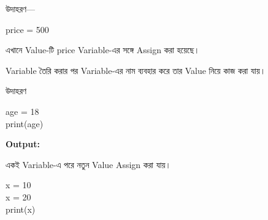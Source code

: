 উদাহরণ—

\begin{codebox}

\begin{english}
\ttfamily
price = 500
\end{english}

\end{codebox}

এখানে
\textenglish{}
Value-টি
\textenglish{\ttfamily price}
Variable-এর সঙ্গে Assign করা হয়েছে।



Variable তৈরি করার পর Variable-এর নাম ব্যবহার করে তার
Value নিয়ে কাজ করা যায়।

\begin{examplebox}{উদাহরণ}

\begin{codebox}

\begin{english}
\ttfamily
age = 18\\
print(age)
\end{english}

\end{codebox}

\textbf{Output:}

\begin{codebox}

\begin{english}
\end{english}

\end{codebox}

\end{examplebox}



একই Variable-এ পরে নতুন Value Assign করা যায়।

\begin{codebox}

\begin{english}
\ttfamily
x = 10\\
x = 20\\
print(x)
\end{english}

\end{codebox}

